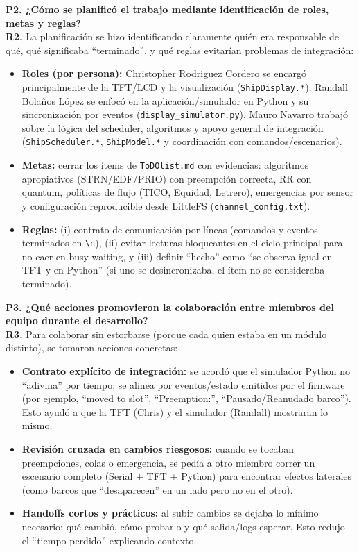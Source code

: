 \documentclass[journal]{IEEEtran}
\begin{document}
\textbf{P2. ¿Cómo se planificó el trabajo mediante identificación de roles, metas y reglas?}\\
\textbf{R2.} La planificación se hizo identificando claramente quién era responsable de qué, qué significaba “terminado”, y qué reglas evitarían problemas de integración:
\begin{itemize}
	\item \textbf{Roles (por persona):} Christopher Rodriguez Cordero se encargó principalmente de la TFT/LCD y la visualización (\texttt{ShipDisplay.*}). Randall Bolaños López se enfocó en la aplicación/simulador en Python y su sincronización por eventos (\texttt{display\_simulator.py}). Mauro Navarro trabajó sobre la lógica del scheduler, algoritmos y apoyo general de integración (\texttt{ShipScheduler.*}, \texttt{ShipModel.*} y coordinación con comandos/escenarios).
	\item \textbf{Metas:} cerrar los ítems de \texttt{ToDOlist.md} con evidencias: algoritmos apropiativos (STRN/EDF/PRIO) con preempción correcta, RR con quantum, políticas de flujo (TICO, Equidad, Letrero), emergencias por sensor y configuración reproducible desde LittleFS (\texttt{channel\_config.txt}).
	\item \textbf{Reglas:} (i) contrato de comunicación por líneas (comandos y eventos terminados en \texttt{\textbackslash n}), (ii) evitar lecturas bloqueantes en el ciclo principal para no caer en busy waiting, y (iii) definir “hecho” como “se observa igual en TFT y en Python” (si uno se desincronizaba, el ítem no se consideraba terminado).
\end{itemize}

\textbf{P3. ¿Qué acciones promovieron la colaboración entre miembros del equipo durante el desarrollo?}\\
\textbf{R3.} Para colaborar sin estorbarse (porque cada quien estaba en un módulo distinto), se tomaron acciones concretas:
\begin{itemize}
	\item \textbf{Contrato explícito de integración:} se acordó que el simulador Python no “adivina” por tiempo; se alinea por eventos/estado emitidos por el firmware (por ejemplo, ``moved to slot'', ``Preemption:'', ``Pausado/Reanudado barco''). Esto ayudó a que la TFT (Chris) y el simulador (Randall) mostraran lo mismo.
	\item \textbf{Revisión cruzada en cambios riesgosos:} cuando se tocaban preempciones, colas o emergencia, se pedía a otro miembro correr un escenario completo (Serial + TFT + Python) para encontrar efectos laterales (como barcos que “desaparecen” en un lado pero no en el otro).
	\item \textbf{Handoffs cortos y prácticos:} al subir cambios se dejaba lo mínimo necesario: qué cambió, cómo probarlo y qué salida/logs esperar. Esto redujo el “tiempo perdido” explicando contexto.
\end{itemize}
\end{document}
